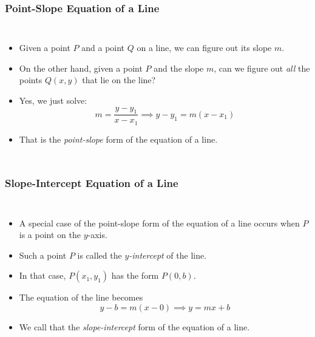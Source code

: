 \documentclass[serif,ignorenonframetext]{beamer}
\begin{document}
\begin{frame}
\begin{columns}
{%
    }
  \end{columns}
\end{frame}

\begin{frame}
  \frametitle{Point-Slope Equation of a Line}
  \begin{columns}
    \begin{itemize}[<+->]
    \item Given a point $P$ and a point $Q$ on a line, we can figure
      out its slope $m$.
    \item On the other hand, given a point $P$ and the slope $m$, can
      we figure out \textit{all} the points $Q(x,y)$ that lie on the line?
    \item Yes, we just solve:
      \begin{equation*}
        m = \frac{y-y_1}{x-x_1} \implies y-y_1 = m(x-x_1)
      \end{equation*}
    \item That is the \textit{point-slope} form of the equation of a line.
    \end{itemize}
  \end{columns}
\end{frame}

\begin{frame}
  \frametitle{Slope-Intercept Equation of a Line}
  \begin{columns}
    \begin{itemize}[<+->]
    \item A special case of the point-slope form of the equation of a
      line occurs when $P$ is a point on the $y$-axis.
    \item Such a point $P$ is called the \textit{$y$-intercept} of the
      line.
    \item In that case, $P(x_1,y_1)$ has the form $P(0,b)$.
    \item The equation of the line becomes
      \begin{equation*}
        y-b = m(x-0) \implies y=mx+b
      \end{equation*}
    \item We call that the \textit{slope-intercept} form of the
      equation of a line.
    \end{itemize}
  \end{columns}
\end{frame}
\end{document}
